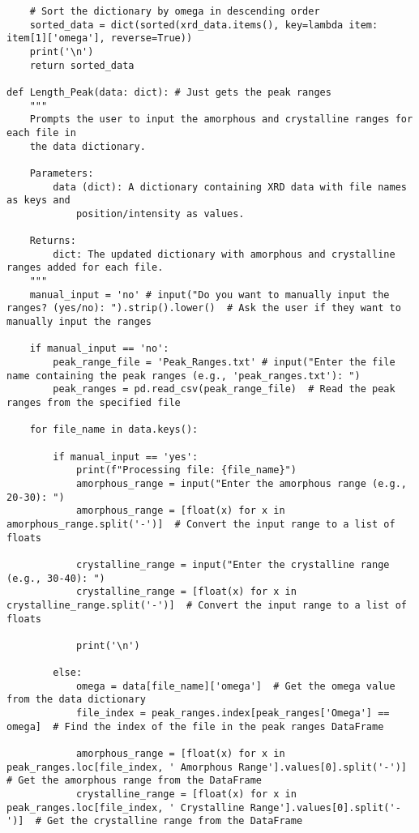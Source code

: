 \begin{small}
\begin{verbatim}
    # Sort the dictionary by omega in descending order
    sorted_data = dict(sorted(xrd_data.items(), key=lambda item: item[1]['omega'], reverse=True))
    print('\n')
    return sorted_data

def Length_Peak(data: dict): # Just gets the peak ranges
    """
    Prompts the user to input the amorphous and crystalline ranges for each file in 
    the data dictionary.

    Parameters:
        data (dict): A dictionary containing XRD data with file names as keys and 
            position/intensity as values.

    Returns:
        dict: The updated dictionary with amorphous and crystalline ranges added for each file.
    """
    manual_input = 'no' # input("Do you want to manually input the ranges? (yes/no): ").strip().lower()  # Ask the user if they want to manually input the ranges

    if manual_input == 'no':
        peak_range_file = 'Peak_Ranges.txt' # input("Enter the file name containing the peak ranges (e.g., 'peak_ranges.txt'): ")
        peak_ranges = pd.read_csv(peak_range_file)  # Read the peak ranges from the specified file

    for file_name in data.keys():

        if manual_input == 'yes':
            print(f"Processing file: {file_name}")
            amorphous_range = input("Enter the amorphous range (e.g., 20-30): ")
            amorphous_range = [float(x) for x in amorphous_range.split('-')]  # Convert the input range to a list of floats

            crystalline_range = input("Enter the crystalline range (e.g., 30-40): ")
            crystalline_range = [float(x) for x in crystalline_range.split('-')]  # Convert the input range to a list of floats

            print('\n')

        else:
            omega = data[file_name]['omega']  # Get the omega value from the data dictionary
            file_index = peak_ranges.index[peak_ranges['Omega'] == omega]  # Find the index of the file in the peak ranges DataFrame

            amorphous_range = [float(x) for x in peak_ranges.loc[file_index, ' Amorphous Range'].values[0].split('-')]  # Get the amorphous range from the DataFrame
            crystalline_range = [float(x) for x in peak_ranges.loc[file_index, ' Crystalline Range'].values[0].split('-')]  # Get the crystalline range from the DataFrame


\end{verbatim}
\end{small}
